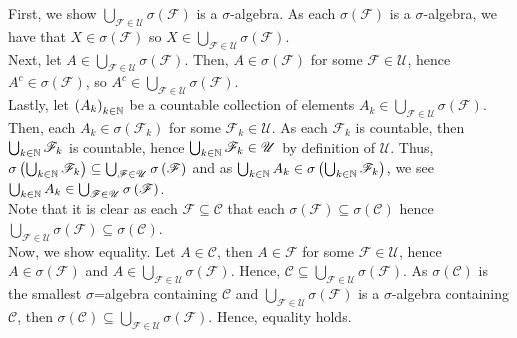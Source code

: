 \documentclass[a4paper]{article}
\begin{document}
\begin{solution}
	First, we show \(\bigcup_{\mathscr{F}\in \mathscr{U}} \sigma \left( \mathscr{F} \right) \) is a \(\sigma\)-algebra. As each \(\sigma \left( \mathscr{F} \right) \) is a \(\sigma\)-algebra, we have that \(X \in \sigma\left( \mathscr{F} \right) \) so \(X \in \bigcup_{\mathscr{F}\in \mathscr{U}} \sigma \left( \mathscr{F} \right) \).\\
	Next, let \(A \in \bigcup_{\mathscr{F}\in \mathscr{U}} \sigma \left( \mathscr{F} \right) \). Then, \(A \in \sigma\left( \mathscr{F} \right) \) for some \(\mathscr{F} \in \mathscr{U}\), hence \(A^{c} \in \sigma ( \mathscr{F})\), so \(A^{c} \in \bigcup_{\mathscr{F}\in \mathscr{U}}  \sigma \left( \mathscr{F} \right) \).\\
	Lastly, let \(\left( A_{k} \right)_{k \in \mathbb{N}} \) be a countable collection of elements \(A_{k} \in \bigcup_{\mathscr{F} \in \mathscr{U}} \sigma \left( \mathscr{F} \right) \). Then, each \(A_{k} \in \sigma \left( \mathscr{F}_{k} \right) \) for some \(\mathscr{F}_{k} \in \mathscr{U}\). As each \(\mathscr{F}_{k}\) is countable, then \(\bigcup_{k \in \mathbb{N}} \mathscr{F}_{k}\) is countable, hence \(\bigcup_{ k\in \mathbb{N}} \mathscr{F}_{k} \in \mathscr{U} \) by definition of \(\mathscr{U}\). Thus, \(\sigma \left( \bigcup_{ k \in \mathbb{N}} \mathscr{F} _{k} \right) \subseteq \bigcup_{\mathscr{F}\in \mathscr{U}} \sigma\left( \mathscr{F} \right) \) and as \(\bigcup_{k \in \mathbb{N}}A_{k} \in \sigma \left( \bigcup_{k \in \mathbb{N}} \mathscr{F}_{k} \right)  \), we see \(\bigcup_{k \in \mathbb{N}}A_{k} \in \bigcup_{\mathscr{F} \in \mathscr{U}} \sigma \left( \mathscr{F} \right)  \).\\

	Note that it is clear as each \(\mathscr{F}\subseteq \mathscr{C}\) that each \(\sigma \left( \mathscr{F} \right) \subseteq \sigma \left( \mathscr{C} \right) \) hence \(\bigcup_{ \mathscr{F} \in \mathscr{U}} \sigma \left( \mathscr{F} \right) \subseteq \sigma \left( \mathscr{C} \right) \).\\
	Now, we show equality. Let \(A \in \mathscr{C}\), then \(A \in \mathscr{F}\) for some \(\mathscr{F}\in \mathscr{U}\), hence \(A \in \sigma \left( \mathscr{F} \right)  \) and \(A \in \bigcup_{\mathscr{F}\in \mathscr{U}} \sigma\left( \mathscr{F} \right) \). Hence, \( \mathscr{C} \subseteq  \bigcup_{\mathscr{F}\in \mathscr{U}} \sigma \left( \mathscr{F} \right)  \). As \(\sigma \left( \mathscr{C} \right) \) is the smallest \(\sigma\)=algebra containing \(\mathscr{C}\) and \(\bigcup_{\mathscr{F}\in \mathscr{U}} \sigma \left( \mathscr{F} \right) \) is a \(\sigma\)-algebra containing \(\mathscr{C}\), then \(\sigma \left( \mathscr{C} \right) \subseteq \bigcup_{\mathscr{F}\in \mathscr{U}}\sigma \left( \mathscr{F} \right)  \). Hence, equality holds.
\end{solution}
\end{document}
